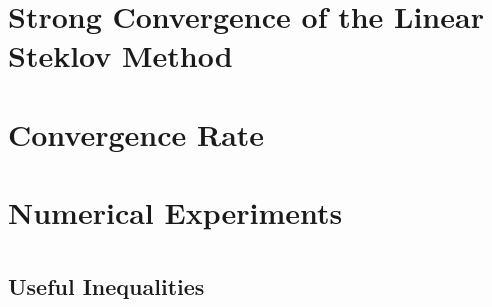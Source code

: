 \documentclass[sort&compress, preprint]{elsarticle}
\theoremstyle{definition}
\theoremstyle{plain}%
\theoremstyle{remark}
\begin{document}
	\section{Strong Convergence of the Linear Steklov Method}
		
	\section{Convergence Rate}
		
	\section{Numerical Experiments}
		
	\pagebreak
	\section*{\refname}
	
	
\appendix
	\begin{appendices}
		\section{Useful Inequalities}
			
	\end{appendices}
\end{document}
